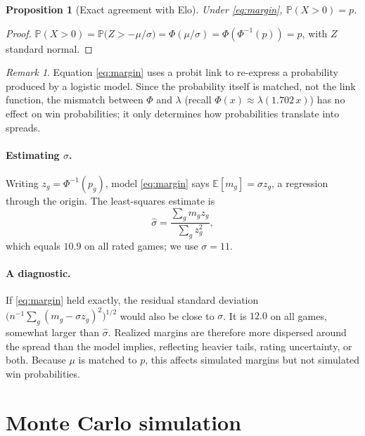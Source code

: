\documentclass[11pt]{article}
\newcommand{\sigmaval}{11}         %
\newcommand{\E}{\mathbb{E}}
\newcommand{\Prob}{\mathbb{P}}
\theoremstyle{plain}
\newtheorem{proposition}{Proposition}
\theoremstyle{definition}
\theoremstyle{remark}
\newtheorem{remark}{Remark}
\begin{document}
\begin{proposition}[Exact agreement with Elo]\label{prop:exact}
Under \eqref{eq:margin}, $\Prob(X > 0) = p$.
\end{proposition}
\begin{proof}
$\Prob(X>0) = \Prob\bigl(Z > -\mu/\sigma\bigr) = \Phi(\mu/\sigma) = \Phi(\Phi^{-1}(p)) = p$, with $Z$ standard normal.
\end{proof}

\begin{remark}
Equation \eqref{eq:margin} uses a probit link to re-express a probability produced by a logistic model. Since the probability itself is matched, not the link function, the mismatch between $\Phi$ and $\lambda$ (recall $\Phi(x) \approx \lambda(1.702\,x)$) has no effect on win probabilities; it only determines how probabilities translate into spreads.
\end{remark}

\paragraph{Estimating $\sigma$.} Writing $z_g = \Phi^{-1}(p_g)$, model \eqref{eq:margin} says $\E[m_g] = \sigma z_g$, a regression through the origin. The least-squares estimate is
\begin{equation}\label{eq:sigmahat}
  \hat\sigma = \frac{\sum_g m_g z_g}{\sum_g z_g^2},
\end{equation}
which equals $10.9$ on all rated games; we use $\sigma = \sigmaval$.

\paragraph{A diagnostic.} If \eqref{eq:margin} held exactly, the residual standard deviation $\bigl(n^{-1}\sum_g (m_g - \sigma z_g)^2\bigr)^{1/2}$ would also be close to $\sigma$. It is $12.0$ on all games, somewhat larger than $\hat\sigma$. Realized margins are therefore more dispersed around the spread than the model implies, reflecting heavier tails, rating uncertainty, or both. Because $\mu$ is matched to $p$, this affects simulated margins but not simulated win probabilities.

\section{Monte Carlo simulation}\label{sec:sim}
\end{document}
